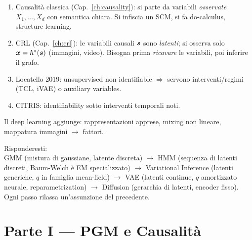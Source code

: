 \begin{tcolorbox}[mywarn, title={Causalità classica vs Causal Representation Learning}]
\begin{enumerate}
  \item Causalità classica (Cap.~\ref{ch:causality}): si parte da variabili \emph{osservate} $X_1,\dots,X_d$ con semantica chiara. Si infiscia un SCM, si fa do-calculus, structure learning.
  \item CRL (Cap.~\ref{ch:crl}): le variabili causali $\bm{s}$ sono \emph{latenti}; si osserva solo $\bm{x} = h^*(\bm{s})$ (immagini, video). Bisogna prima \emph{ricavare} le variabili, poi inferire il grafo.
  \item Locatello 2019: unsupervised non identifiable $\Rightarrow$ servono interventi/regimi (TCL, iVAE) o auxiliary variables.
  \item CITRIS: identifiability sotto interventi temporali noti.
\end{enumerate}
Il deep learning aggiunge: rappresentazioni apprese, mixing non lineare, mappatura immagini $\to$ fattori.
\end{tcolorbox}

\begin{tcolorbox}[mywarn, title={Modelli a variabile latente: una panoramica EM-style}]
Risponderesti: \\
GMM (mistura di gaussiane, latente discreta) $\to$ HMM (sequenza di latenti discreti, Baum-Welch è EM specializzato) $\to$ Variational Inference (latenti generiche, $q$ in famiglia mean-field) $\to$ VAE (latenti continue, $q$ amortizzato neurale, reparametrization) $\to$ Diffusion (gerarchia di latenti, encoder fisso). Ogni passo rilassa un'assunzione del precedente.
\end{tcolorbox}

\section{Parte I — PGM e Causalità}

